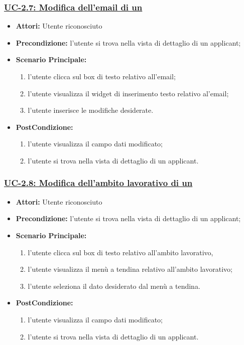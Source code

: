 \subsubsection{\underline{UC-2.7: Modifica dell'email di un \applicant}}
\begin{itemize}
	\item \textbf{Attori:} Utente riconosciuto
	\item \textbf{Precondizione:}  l'utente si trova nella vista di dettaglio di un applicant;
	\item \textbf{Scenario Principale:}
	\begin{enumerate}
		\item l'utente clicca sul box di testo relativo all'email;
		\item l'utente visualizza il  widget di inserimento testo relativo al'email;
		\item l'utente inserisce le modifiche desiderate.
	\end{enumerate}
	\item \textbf{PostCondizione:} 
	\begin{enumerate}
		\item l'utente visualizza il campo dati modificato;
		\item l'utente si trova nella vista di dettaglio di un applicant.
	\end{enumerate}
	
\end{itemize}

\subsubsection{\underline{UC-2.8: Modifica dell'ambito lavorativo di un \applicant}}
\begin{itemize}
	\item \textbf{Attori:} Utente riconosciuto
	\item \textbf{Precondizione:}  l'utente si trova nella vista di dettaglio di un applicant;
	\item \textbf{Scenario Principale:}
	\begin{enumerate}
		\item l'utente clicca sul box di testo relativo all'ambito lavorativo,
		\item l'utente visualizza il  menù a tendina relativo all'ambito lavorativo;
		\item l'utente seleziona il dato desiderato dal menù a tendina.
	\end{enumerate}
	\item \textbf{PostCondizione:} 
	\begin{enumerate}
		\item l'utente visualizza il campo dati modificato;
		\item l'utente si trova nella vista di dettaglio di un applicant.
	\end{enumerate}
	
\end{itemize}

